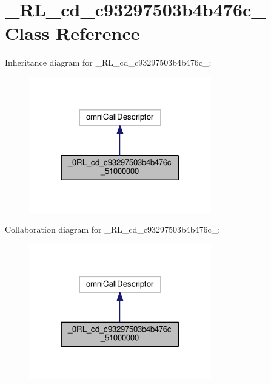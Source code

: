 \hypertarget{class__0_r_l__cd__c93297503b4b476c__51000000}{}\section{\+\_\+R\+L\+\_\+cd\+\_\+c93297503b4b476c\+\_ Class Reference}
\label{class__0_r_l__cd__c93297503b4b476c__51000000}


Inheritance diagram for \+\_\+R\+L\+\_\+cd\+\_\+c93297503b4b476c\+\_\+:
\nopagebreak
\begin{figure}[H]
\begin{center}
\leavevmode
\includegraphics[width=225pt]{class__0_r_l__cd__c93297503b4b476c__51000000__inherit__graph}
\end{center}
\end{figure}


Collaboration diagram for \+\_\+R\+L\+\_\+cd\+\_\+c93297503b4b476c\+\_\+:
\nopagebreak
\begin{figure}[H]
\begin{center}
\leavevmode
\includegraphics[width=225pt]{class__0_r_l__cd__c93297503b4b476c__51000000__coll__graph}
\end{center}
\end{figure}
